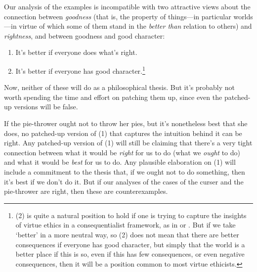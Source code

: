 Our analysis of the examples is incompatible with two attractive views about the connection between \textit{goodness} (that is, the property of things---in particular worlds---in virtue of which some of them stand in the \textit{better than} relation to others) and \textit{rightness}, and between goodness and good character:

\begin{enumerate}
\item It's better if everyone does what's right.
\item It's better if everyone has good character.\footnote{(2) is quite a natural position to hold if one is trying to capture the insights of virtue ethics in a consequentialist framework, as in \citet{Driver2001} or \citet{Hurka2001}. But if we take `better' in a more neutral way, so (2) does not mean that there are better consequences if everyone has good character, but simply that the world is a better place if this is so, even if this has few consequences, or even negative consequences, then it will be a position common to most virtue ethicists.}
\end{enumerate}

Now, neither of these will do as a philosophical thesis.  But it's probably not worth spending the time and effort on patching them up, since even the patched-up versions will be false.  

If the pie-thrower ought not to throw her pies, but it's nonetheless best that she does, no patched-up version of (1) that captures the intuition behind it can be right. Any patched-up version of (1) will still be claiming that there's a very tight connection between what it would be \textit{right} for us to do (what we \textit{ought} to do) and what it would be \textit{best} for us to do.  Any plausible elaboration on (1) will include a commitment to the thesis that, if we ought not to do something, then it's best if we don't do it.  But if our analyses of the cases of the curser and the pie-thrower are right, then these are counterexamples.

